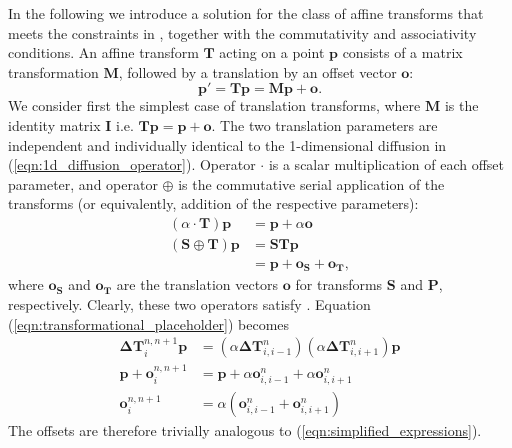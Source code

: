 	  In the following we introduce a solution for the class of affine transforms that meets the constraints in  , together with the commutativity and associativity conditions. An affine transform $\mathbf{T}$ acting on a point $\mathbf{p}$ consists of a matrix transformation $\mathbf{M}$, followed by a translation by an offset vector $\mathbf{o}$:
		\begin{equation}
			\mathbf{p'} = \mathbf{Tp}= \mathbf{Mp} + \mathbf{o}.
		\end{equation}
		We consider first the simplest case of translation transforms, where $\mathbf{M}$ is the identity matrix $\mathbf{I}$ i.e. $\mathbf{Tp} = \mathbf{p} + \mathbf{o}$. The two translation parameters are independent and individually identical to the 1-dimensional diffusion in (\ref{eqn:1d_diffusion_operator}). Operator $\cdot$ is a scalar multiplication of each offset parameter, and operator $\oplus$ is the commutative serial application of the transforms (or equivalently, addition of the respective parameters):
		\begin{align}
			(\alpha \cdot \mathbf{T}) \mathbf{p} &= \mathbf{p} + \alpha\mathbf{o} \label{eqn:translation_cdot}\\
			(\mathbf{S} \oplus \mathbf{T}) \mathbf{p} &= \mathbf{STp} \\
			                                          &= \mathbf{p} + \mathbf{o_S} + \mathbf{o_T} \label{eqn:translation_oplus},
		\end{align}
    where $\mathbf{o_S}$ and $\mathbf{o_T}$ are the translation vectors $\mathbf{o}$ for transforms $\mathbf{S}$ and $\mathbf{P}$, respectively. Clearly, these two operators satisfy . Equation (\ref{eqn:transformational_placeholder}) becomes
		\begin{align}
		 	\mathbf{\Delta T}_i^{n,n+1} \mathbf{p} &= (\alpha \mathbf{\Delta T}_{i,i-1}^n) (\alpha \mathbf{\Delta T}_{i,i+1}^n) \mathbf{p} \\
			\mathbf{p} + \mathbf{o}_i^{n,n+1} &= \mathbf{p} + \alpha \mathbf{o}_{i,i-1}^n + \alpha \mathbf{o}_{i,i+1}^n \\
			\mathbf{o}_i^{n,n+1} &= \alpha (\mathbf{o}_{i,i-1}^n + \mathbf{o}_{i,i+1}^n) 
		\end{align}
		The offsets are therefore trivially analogous to (\ref{eqn:simplified_expressions}).
    
